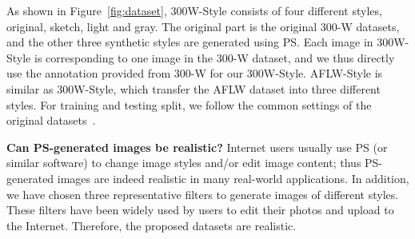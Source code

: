 \documentclass[10pt,twocolumn,letterpaper]{article}
\begin{document}
As shown in Figure~\ref{fig:dataset}, 300W-Style consists of four different styles, original, sketch, light and gray.
The original part is the original 300-W datasets, and the other three synthetic styles are generated using PS.
Each image in 300W-Style is corresponding to one image in the 300-W dataset, and we thus directly use the annotation provided from 300-W for our 300W-Style.
AFLW-Style is similar as 300W-Style, which transfer the AFLW dataset into three different styles.
For training and testing split, we follow the common settings of the original datasets~\cite{sagonas2013300,koestinger2011annotated}.

{\bf Can PS-generated images be realistic?}
Internet users usually use PS (or similar software) to change image styles and/or edit image content; thus PS-generated images are indeed realistic in many real-world applications.
In addition, we have chosen three representative filters to generate images of different styles. These filters have been widely used by users to edit their photos and upload to the Internet. Therefore, the proposed datasets are realistic.
\end{document}

